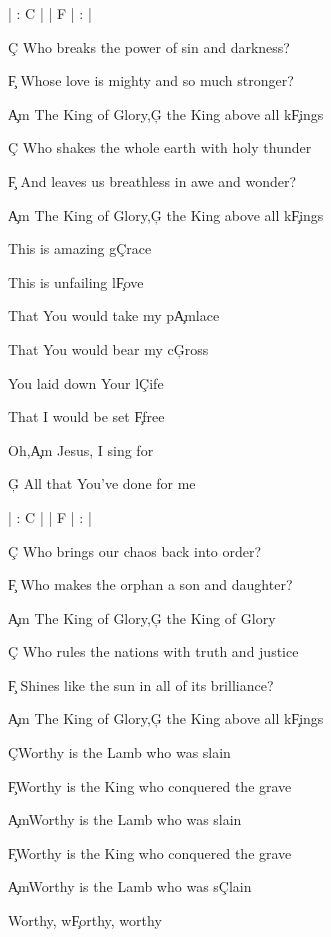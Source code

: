 \documentclass[9pt]{extarticle}
\begin{document}
\bsong

\bi
| : C |  | F | : |
\ei

\bv
\c{C} Who breaks the power of sin and darkness?

\c{F} Whose love is mighty and so much stronger?

\c{Am} The King of Glory,\c{G} the King above all k\c{F}ings
\ev

\bv
\c{C} Who shakes the whole earth with holy thunder

\c{F} And leaves us breathless in awe and wonder?

\c{Am} The King of Glory,\c{G} the King above all k\c{F}ings
\ev

\bc
This is amazing g\c{C}race

This is unfailing l\c{F}ove

That You would take my p\c{Am}lace

That You would bear my c\c{G}ross



You laid down Your l\c{C}ife

That I would be set \c{F}free

Oh,\c{Am} Jesus, I sing for

\c{G} All that You've done for me
\ec

\bin
| : C |  | F | : |
\ein

\bv
\c{C} Who brings our chaos back into order?

\c{F} Who makes the orphan a son and daughter?

\c{Am} The King of Glory,\c{G} the King of Glory
\ev

\bv
\c{C} Who rules the nations with truth and justice

\c{F} Shines like the sun in all of its brilliance?

\c{Am} The King of Glory,\c{G} the King above all k\c{F}ings
\ev


\bb
\c{C}Worthy is the Lamb who was slain

\c{F}Worthy is the King who conquered the grave
\eb

\bb
\c{Am}Worthy is the Lamb who was slain

\c{F}Worthy is the King who conquered the grave
\eb


\bb
\c{Am}Worthy is the Lamb who was s\c{C}lain

Worthy, w\c{F}orthy, worthy
\eb


\esong
\end{document}
